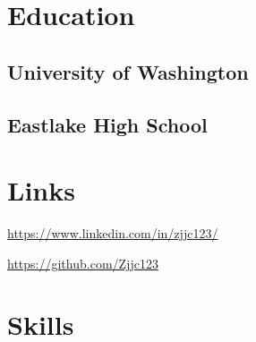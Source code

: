 \documentclass[]{main}
\begin{document}
%
%

%
%

%
%

\begin{minipage}[t]{0.33\textwidth} 

\vspace{5pt}
\section{Education} 

\subsection{University of Washington}
\sectionsep

\subsection{Eastlake High School}
\sectionsep


\section{Links} 

\href{https://www.linkedin.com/in/zjjc123/}{https://www.linkedin.com/in/zjjc123/} \\

\href{https://github.com/Zjjc123}{https://github.com/Zjjc123} \\



\section{Skills}


\end{minipage}
\end{document}
